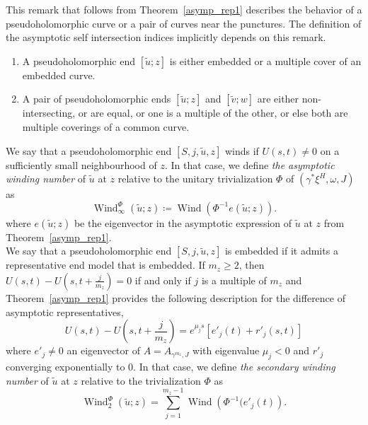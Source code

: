 \documentclass[11pt, a4paper]{amsart}
\DeclareMathOperator{\wind}{Wind}
\begin{document}
\begin{remark}
This remark that follows from Theorem~\ref{asymp_rep1} describes the behavior of a pseudoholomorphic curve or a pair of curves near the punctures. The definition of the asymptotic self intersection indices implicitly depends on this remark.
\begin{enumerate}
    \item A pseudoholomorphic end $[\tilde{u};z]$ is either embedded or a multiple cover of an embedded curve.
    \item A pair of pseudoholomorphic ends $[\tilde{u};z]$ and $[\tilde{v};w]$ are either non-intersecting, or are equal, or one is a multiple of the other, or else both are multiple coverings of a common curve.
    \end{enumerate}
\end{remark}


We say that a pseudoholomorphic end $[S,j,\tilde{u},z]$ winds if $U(s,t) \neq 0$ on a sufficiently small neighbourhood of $z$. In that case, we define \textit{the asymptotic winding number} of $\tilde{u}$ at $z$ relative to the unitary trivialization $\Phi$ of $(\gamma^* \xi^H , \omega, J)$ as $$\wind^{\Phi}_{\infty}(\tilde{u}; z)\coloneqq \wind\left(\Phi^{-1} e (\tilde{u}; z)\right).$$
where $e(\tilde{u}; z)$ be the eigenvector in the asymptotic expression of $\tilde{u}$ at $z$ from Theorem~\ref{asymp_rep1}.\\

We say that a pseudoholomorphic end $[S,j,\tilde{u},z]$ is embedded if it admits a representative end model that is embedded. If $m_z \geq 2$, then $U(s, t)-U\left(s,t+ \frac{j}{m_z}\right) = 0$ if and only if $j$ is a multiple of $m_z$ and Theorem~\ref{asymp_rep1} provides the following description for the difference of asymptotic representatives,
$$U(s, t)- U\left(s, t + \frac{j}{m_z} \right) = e^{\mu_j s} \left[e'_j(t) + r'_j (s, t)\right]$$
where $e'_j \neq 0$ an eigenvector of $A = A_{\gamma^{m_z},J}$ with eigenvalue $\mu_j < 0$ and $r'_j$ converging exponentially to $0$. In that case, we define \textit{the secondary winding number} of $\tilde{u}$ at $z$ relative to the trivialization $\Phi$ as 
$$\wind^{\Phi}_2(\tilde{u}; z)= \sum_{j=1}^{m_z-1} \wind\left(\Phi^{-1} (e'_j(t)\right).$$
\end{document}
